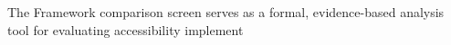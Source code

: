 The Framework comparison screen serves as a formal, evidence-based analysis tool for evaluating accessibility implement